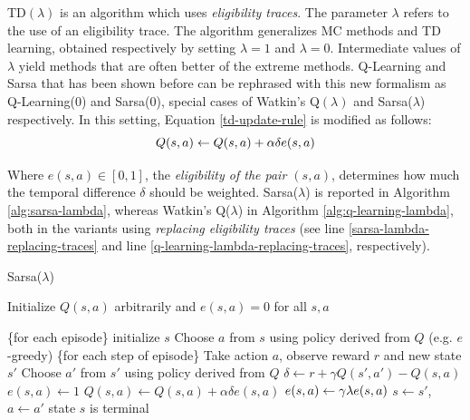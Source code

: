 TD$(\lambda)$ is an algorithm which uses \emph{eligibility traces}. The parameter $\lambda$ refers to the use of an eligibility trace. The algorithm generalizes MC methods and TD learning, obtained respectively by setting $\lambda = 1$ and $\lambda = 0$. Intermediate values of $\lambda$ yield methods that are often better of the extreme methods. 
Q-Learning and Sarsa that has been shown before can be rephrased with this new formalism as Q-Learning(0) and Sarsa(0), special cases of Watkin's Q$(\lambda)$ and Sarsa($\lambda$) respectively.
In this setting, Equation \ref{td-update-rule} is modified as follows:
\begin{equation}\label{td-lambda-update-rule}
Q(s, a) \leftarrow Q(s, a) + \alpha \delta e(s, a)
\end{equation}

Where $e(s, a) \in [0, 1]$, the \emph{eligibility of the pair $(s, a)$}, determines how much the temporal difference $\delta$ should be weighted.
Sarsa($\lambda$) is reported in Algorithm \ref{alg:sarsa-lambda}, whereas Watkin's Q($\lambda$) in Algorithm \ref{alg:q-learning-lambda}, both  in the variants using \emph{replacing eligibility traces} (see line \ref{sarsa-lambda-replacing-traces} and line \ref{q-learning-lambda-replacing-traces}, respectively).
\begin{algorithm}
	\caption{Sarsa($\lambda$) \citep{Singh:1996:RLR:225667.225679}}
	\label{alg:sarsa-lambda}
	\begin{algorithmic}[1]
		\State Initialize $Q(s, a)$ arbitrarily and $e(s, a)=0$ for all $s, a$
		
		\Repeat \{for each episode\} 
			\State initialize $s$
			\State Choose $a$ from $s$ using policy derived from $Q$ (e.g. $e$-greedy)
			\Repeat \{for each step of episode\}
				\State Take action $a$, observe reward $r$ and new state $s'$
				\State Choose $a'$ from $s'$ using policy derived from $Q$
				\State $\delta \gets r + \gamma Q(s', a') - Q(s, a)$
				\State $e(s, a) \gets 1$  \label{sarsa-lambda-replacing-traces}
					\State $Q(s, a) \gets Q(s, a) + \alpha\delta e(s, a)$
					\State $e(s, a) \gets \gamma\lambda e(s, a)$
				\EndFor
				\State $s\gets s'$, $a \gets a'$
			\Until state $s$ is terminal
		\Until
	\end{algorithmic}
	
\end{algorithm}
